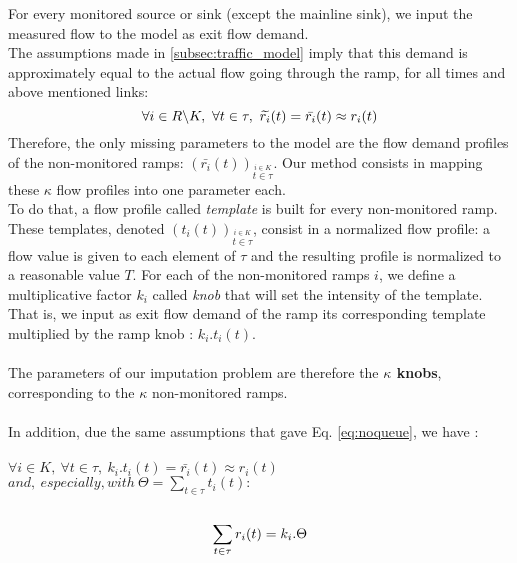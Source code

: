 For every monitored source or sink (except the mainline sink), we input the measured flow to the model as exit flow demand.\\ The assumptions made in \ref{subsec:traffic_model} imply that this demand is approximately equal to the actual flow going through the ramp, for all times and above mentioned links:\\
\begin{equation}
	\label{eq:noqueue}
	\forall i\in R\backslash K,\ \forall t\in \tau,\ \widetilde{r_{i}}(t)=\bar{r_{i}}(t)\approx {r_{i}}(t)\\
\end{equation}
Therefore, the only missing parameters to the model are the flow demand profiles of the non-monitored ramps: $(\bar{r_{i}}(t))_{\stackrel{i\in K}{t \in{\tau}}}$.
Our method consists in mapping these $\kappa$ flow profiles into one parameter each.\\
To do that, a flow profile called \emph{template} is built for every non-monitored ramp. These templates, denoted $(t_{i}(t))_{\stackrel{i\in{K}}{t \in{\tau}}}$, consist in a normalized flow profile: a flow value is given to each element of $\tau$ and the resulting profile is normalized to a reasonable value $T$.
For each of the non-monitored ramps $i$, we define a multiplicative factor $k_{i}$ called \emph{knob} that will set the intensity of the template. 
That is, we input as exit flow demand of the ramp its corresponding template multiplied by the ramp knob : $k_{i}.t_{i}(t)$.\\
\\
The parameters of our imputation problem are therefore the \textbf{$\kappa$ knobs}, corresponding to the $\kappa$ non-monitored ramps.\\
\\
In addition, due the same assumptions that gave Eq. \ref{eq:noqueue}, we have :\\
\\
$\forall i \in K,\ \forall t\in \tau,\ k_{i}.t_{i}(t)=\bar{r_{i}}(t)\approx r_{i}(t)$\\
$and,\ especially, with\ \Theta=\sum\limits_{t\in\tau}t_{i}(t):$\\
\\
\begin{equation}
	\label{eq:noqueuetemplate}
	\sum\limits_{t \in \tau} r_{i}(t)=k_{i}.\Theta\\
\end{equation}